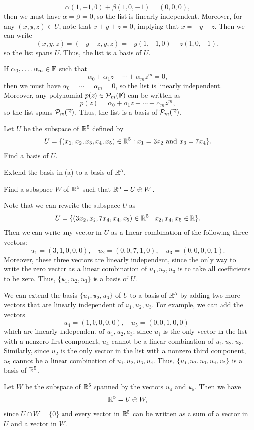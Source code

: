 \begin{exc}
\begin{solution}
\begin{parts}
  \[ \alpha(1,-1,0)+\beta(1,0,-1) = (0,0,0), \]
  then we must have $\alpha=\beta=0$, so the list is linearly independent.
  Moreover, for any $(x,y,z)\in U$, note that $x+y+z=0$, implying that
  $x=-y-z$. Then we can write
  \[ (x,y,z) = (-y-z,y,z) = -y(1,-1,0)-z(1,0,-1), \]
  so the list spans $U$. Thus, the list is a basis of $U$.
\item If $\alpha_0,\dots,\alpha_m\in\mathbb{F}$ such that
  \[ \alpha_0+\alpha_1z+\cdots+\alpha_mz^m = 0, \]
  then we must have $\alpha_0=\cdots=\alpha_m=0$, so the list is linearly
  independent. Moreover, any polynomial $p(z)\in\mathcal{P}_m(\mathbb{F})$ can be written as
  \[ p(z) = \alpha_0+\alpha_1z+\cdots+\alpha_mz^m, \]
  so the list spans $\mathcal{P}_m(\mathbb{F})$. Thus, the list is a basis of $\mathcal{P}_m(\mathbb{F})$.
\end{parts}
\end{solution}

\begin{exercise}\leavevmode
\begin{parts}
\item Let $U$ be the subspace of $\mathbb{R}^5$ defined by
  \[ U = \{(x_1,x_2,x_3,x_4,x_5)\in\mathbb{R}^5 : x_1=3x_2 \text{ and } x_3=7x_4\}. \]
  Find a basis of $U$.
\item Extend the basis in (a) to a basis of $\mathbb{R}^5$.
\item Find a subspace $W$ of $\mathbb{R}^5$ such that $\mathbb{R}^5=U\oplus W$.
\end{parts}
\end{exercise}
\begin{solution}\leavevmode
\begin{parts}
\item Note that we can rewrite the subspace $U$ as
  \[ U = \{(3x_2,x_2,7x_4,x_4,x_5)\in\mathbb{R}^5 \mid x_2,x_4,x_5\in\mathbb{R}\}. \]
  Then we can write any vector in $U$ as a linear combination of the following
  three vectors:
  \[ u_1=(3,1,0,0,0), \quad u_2=(0,0,7,1,0), \quad u_3=(0,0,0,0,1). \]
  Moreover, these three vectors are linearly independent, since the only way to
  write the zero vector as a linear combination of $u_1,u_2,u_3$ is to take all
  coefficients to be zero. Thus, $\{u_1,u_2,u_3\}$ is a basis of $U$.
\item We can extend the basis $\{u_1,u_2,u_3\}$ of $U$ to a basis of $\mathbb{R}^5$ by
  adding two more vectors that are linearly independent of $u_1,u_2,u_3$. For
  example, we can add the vectors
  \[ u_4=(1,0,0,0,0), \quad u_5=(0,0,1,0,0), \]
  which are linearly independent of $u_1,u_2,u_3$: since $u_1$ is the only
  vector in the list with a nonzero first component, $u_4$ cannot be a linear
  combination of $u_1,u_2,u_3$. Similarly, since $u_2$ is the only vector in the
  list with a nonzero third component, $u_5$ cannot be a linear combination of
  $u_1,u_2,u_3,u_4$. Thus, $\{u_1,u_2,u_3,u_4,u_5\}$ is a basis of $\mathbb{R}^5$.
\item Let $W$ be the subspace of $\mathbb{R}^5$ spanned by the vectors $u_4$ and $u_5$.
  Then we have
  \[ \mathbb{R}^5 = U\oplus W, \]
  since $U\cap W=\{0\}$ and every vector in $\mathbb{R}^5$ can be written as a sum of a
  vector in $U$ and a vector in $W$.
\end{parts}
\end{solution}


\end{exc}
